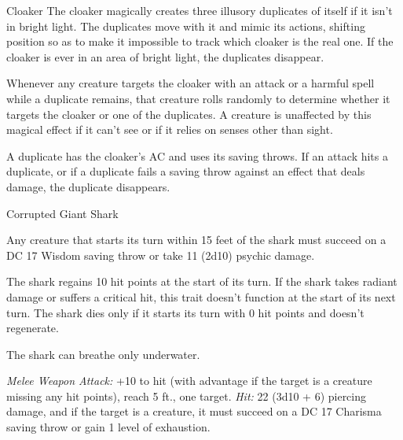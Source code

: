 \documentclass[10pt,a4paper,twoside,bg=none,twocolumn,openany,nodeprecatedcode]{dndbook}
\begin{document}
\begin{DndMonster}[float=t]{Cloaker}
The cloaker magically creates three illusory duplicates of itself if it isn't in bright light. The duplicates move with it and mimic its actions, shifting position so as to make it impossible to track which cloaker is the real one. If the cloaker is ever in an area of bright light, the duplicates disappear.

Whenever any creature targets the cloaker with an attack or a harmful spell while a duplicate remains, that creature rolls randomly to determine whether it targets the cloaker or one of the duplicates. A creature is unaffected by this magical effect if it can't see or if it relies on senses other than sight.

A duplicate has the cloaker's AC and uses its saving throws. If an attack hits a duplicate, or if a duplicate fails a saving throw against an effect that deals damage, the duplicate disappears.

\end{DndMonster}



\begin{DndMonster}[float=t]{Corrupted Giant Shark}
\DndMonsterBasics[
armor-class = {13 (natural armor)},
hit-points = {\DndDice{11d12 + 55}},
speed = {0 ft., swim 50 ft.}
]
\DndMonsterAbilityScores[
 str = 23,
 dex = 11,
 con = 21,
 int = 1,
 wis = 10,
 cha = 5
]
\DndMonsterDetails[
skills = {Perception +4},
senses = {blindsight 60 ft., passive perception 14},
challenge = 9,
]
Any creature that starts its turn within 15 feet of the shark must succeed on a DC 17 Wisdom saving throw or take 11 (2d10) psychic damage.

The shark regains 10 hit points at the start of its turn. If the shark takes radiant damage or suffers a critical hit, this trait doesn't function at the start of its next turn. The shark dies only if it starts its turn with 0 hit points and doesn't regenerate.

The shark can breathe only underwater.

\par
{}
\textsl{Melee Weapon Attack:} +10 to hit (with advantage if the target is a creature missing any hit points), reach 5 ft., one target. \textsl{Hit:} 22 (3d10 + 6) piercing damage, and if the target is a creature, it must succeed on a DC 17 Charisma saving throw or gain 1 level of exhaustion.

\end{DndMonster}
\end{document}
